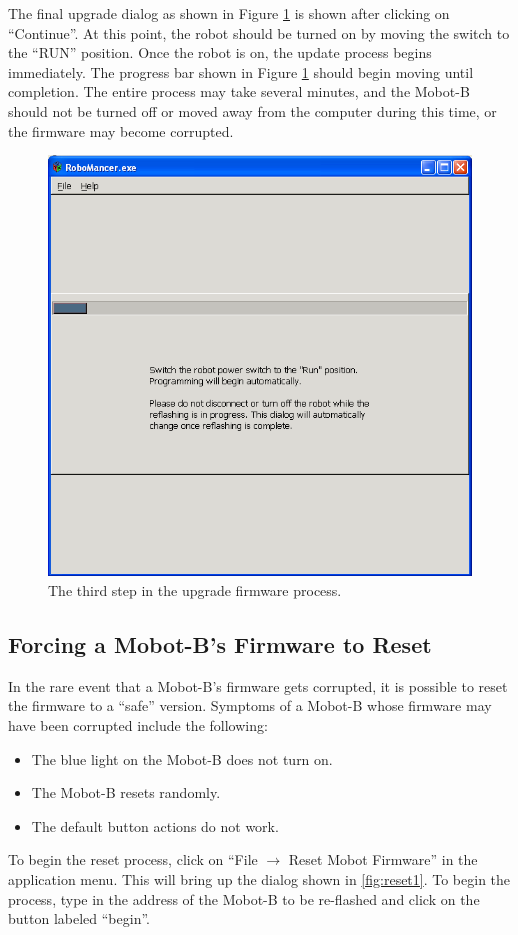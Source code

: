 \documentclass{article}
\begin{document}
The final upgrade dialog as shown in Figure \ref{fig:update4}  is shown after
clicking on ``Continue''. At this point, the
robot should be turned on by moving the switch to the ``RUN'' position. Once the
robot is on, the update process begins immediately. The progress bar shown in 
Figure \ref{fig:update4} should begin moving until completion. The entire process 
may take several minutes, and the Mobot-B should not be turned off or moved away from
the computer during this time, or the firmware may become corrupted.

\begin{figure}[H]
\begin{center}
\includegraphics[width=4.5in]{images/reset4.png}
\end{center}
\caption{\label{fig:update4} The third step in the upgrade firmware process.}
\end{figure}

\subsection{Forcing a Mobot-B's Firmware to Reset}
In the rare event that a Mobot-B's firmware gets corrupted, it is possible to 
reset the firmware to a ``safe'' version. Symptoms of a Mobot-B whose firmware
may have been corrupted include the following:
\begin{itemize}
\item The blue light on the Mobot-B does not turn on.
\item The Mobot-B resets randomly.
\item The default button actions do not work.
\end{itemize}
To begin the reset process, click on
``File $\rightarrow$ Reset Mobot Firmware'' in the application menu. This will bring up the dialog shown
in \ref{fig:reset1}. To begin the process, type in the address of the Mobot-B to be re-flashed
and click on the button labeled ``begin''. 
\end{document}

